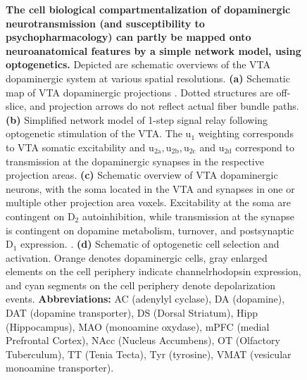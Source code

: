 \begin{sansmath}
\begin{figure}[h!]
	\caption{
		\textbf{The cell biological compartmentalization of dopaminergic neurotransmission (and susceptibility to psychopharmacology) can partly be mapped onto neuroanatomical features by a simple network model, using optogenetics.}
		Depicted are schematic overviews of the VTA dopaminergic system at various spatial resolutions.
		\textbf{(a)}
                        Schematic map of VTA dopaminergic projections \cite{Aransay2015,Fields2007,Ikemoto2007,Pan2010}.
			Dotted structures are off-slice, and projection arrows do not reflect actual fiber bundle paths.
		\textbf{(b)}
			Simplified network model of 1-step signal relay following optogenetic stimulation of the VTA.
			The $\mathrm{u_1}$ weighting corresponds to VTA somatic excitability and $\mathrm{u_{2a},u_{2b},u_{2c}}$ and $\mathrm{u_{2d}}$ correspond to transmission at the dopaminergic synapses in the respective projection areas.
		\textbf{(c)}
			Schematic overview of VTA dopaminergic neurons, with the soma located in the VTA and synapses in one or multiple other projection area voxels.
			Excitability at the soma are contingent on $\mathrm{D_2}$ autoinhibition, while transmission at the synapse is contingent on dopamine metabolism, turnover, and postsynaptic $\mathrm{D_1}$ expression.
                        \cite{Torres2003}.
		\textbf{(d)}
			Schematic of optogenetic cell selection and activation.
			Orange denotes dopaminergic cells, gray enlarged elements on the cell periphery indicate channelrhodopsin expression, and cyan segments on the cell periphery denote depolarization events.
		\textbf{Abbreviations:}
			AC (adenylyl cyclase),
                        DA (dopamine),
                        DAT (dopamine transporter),
                        DS (Dorsal Striatum),
			Hipp (Hippocampus),
                        MAO (monoamine oxydase),
                        mPFC (medial Prefrontal Cortex),
                        NAcc (Nucleus Accumbens),
                        OT (Olfactory Tuberculum),
                        TT (Tenia Tecta),
                        Tyr (tyrosine),
                        VMAT (vesicular monoamine transporter).
		}
	\label{fig:m}
\end{figure}
\end{sansmath}

